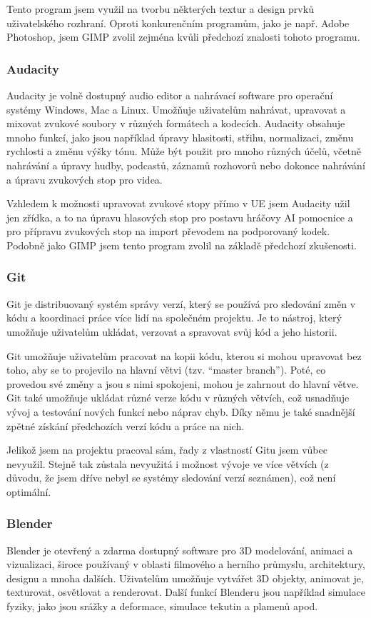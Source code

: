 \documentclass[12pt,a4paper,hidelinks]{article}
\begin{document}
Tento program jsem využil na tvorbu některých textur a design prvků uživatelského rozhraní. Oproti konkurenčním programům, jako je např. Adobe Photoshop, jsem GIMP zvolil zejména kvůli předchozí znalosti tohoto programu.

\subsubsection{Audacity}
Audacity je volně dostupný audio editor a nahrávací software pro operační systémy Windows, Mac a Linux. Umožňuje uživatelům nahrávat, upravovat a mixovat zvukové soubory v různých formátech a kodecích. Audacity obsahuje mnoho funkcí, jako jsou například úpravy hlasitosti, střihu, normalizaci, změnu rychlosti a změnu výšky tónu. Může být použit pro mnoho různých účelů, včetně nahrávání a úpravy hudby, podcastů, záznamů rozhovorů nebo dokonce nahrávání a úpravu zvukových stop pro videa.

Vzhledem k možnosti upravovat zvukové stopy přímo v UE jsem Audacity užil jen zřídka, a to na úpravu hlasových stop pro postavu hráčovy AI pomocnice a pro přípravu zvukových stop na import převodem na podporovaný kodek. Podobně jako GIMP jsem tento program zvolil na základě předchozí zkušenosti.


\subsubsection{Git}
Git je distribuovaný systém správy verzí, který se používá pro sledování změn v kódu a koordinaci práce více lidí na společném projektu. Je to nástroj, který umožňuje uživatelům ukládat, verzovat a spravovat svůj kód a jeho historii.

Git umožňuje uživatelům pracovat na kopii kódu, kterou si mohou upravovat bez toho, aby se to projevilo na hlavní větvi (tzv. \enquote{master branch}). Poté, co provedou své změny a jsou s nimi spokojeni, mohou je zahrnout do hlavní větve. Git také umožňuje ukládat různé verze kódu v různých větvích, což usnadňuje vývoj a testování nových funkcí nebo náprav chyb. Díky němu je také snadnější zpětné získání předchozích verzí kódu a práce na nich.

Jelikož jsem na projektu pracoval sám, řady z vlastností Gitu jsem vůbec nevyužil. Stejně tak zůstala nevyužitá i možnost vývoje ve více větvích (z důvodu, že jsem dříve nebyl se systémy sledování verzí seznámen), což není optimální.

\subsubsection{Blender}
Blender je otevřený a zdarma dostupný software pro 3D modelování, animaci a vizualizaci, široce používaný v oblasti filmového a herního průmyslu, architektury, designu a mnoha dalších. Uživatelům umožňuje vytvářet 3D objekty, animovat je, texturovat, osvětlovat a renderovat. Další funkcí Blenderu jsou například simulace fyziky, jako jsou srážky a deformace, simulace tekutin a plamenů apod.
\end{document}
